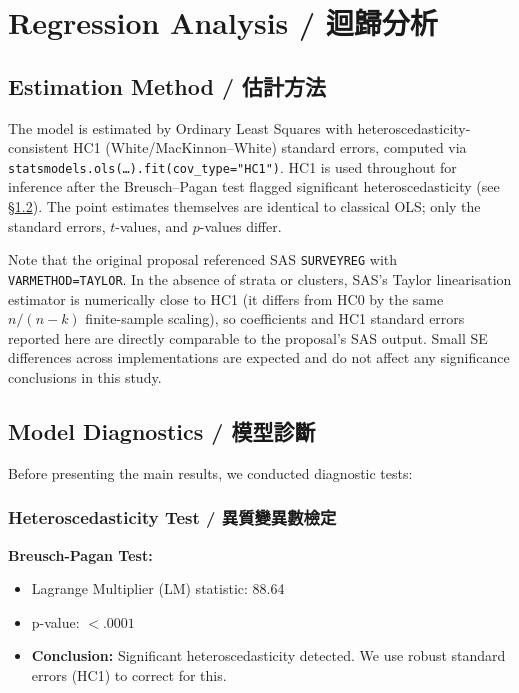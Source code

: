 \documentclass[12pt,a4paper,fontset=none]{ctexart}
\begin{document}
\newpage

\section{Regression Analysis / 迴歸分析}

\subsection{Estimation Method / 估計方法}

The model is estimated by Ordinary Least Squares with heteroscedasticity-consistent HC1 (White/MacKinnon--White) standard errors, computed via \texttt{statsmodels.ols(\ldots).fit(cov\_type="HC1")}. HC1 is used throughout for inference after the Breusch--Pagan test flagged significant heteroscedasticity (see \S\ref{sec:diag}). The point estimates themselves are identical to classical OLS; only the standard errors, $t$-values, and $p$-values differ.

Note that the original proposal referenced SAS \texttt{SURVEYREG} with \texttt{VARMETHOD=TAYLOR}. In the absence of strata or clusters, SAS's Taylor linearisation estimator is numerically close to HC1 (it differs from HC0 by the same $n/(n-k)$ finite-sample scaling), so coefficients and HC1 standard errors reported here are directly comparable to the proposal's SAS output. Small SE differences across implementations are expected and do not affect any significance conclusions in this study.

\subsection{Model Diagnostics / 模型診斷}
\label{sec:diag}

Before presenting the main results, we conducted diagnostic tests:

\subsubsection{Heteroscedasticity Test / 異質變異數檢定}

\textbf{Breusch-Pagan Test:}
\begin{itemize}
    \item Lagrange Multiplier (LM) statistic: 88.64
    \item p-value: $< .0001$
    \item \textbf{Conclusion:} Significant heteroscedasticity detected. We use robust standard errors (HC1) to correct for this.
\end{itemize}
\end{document}
